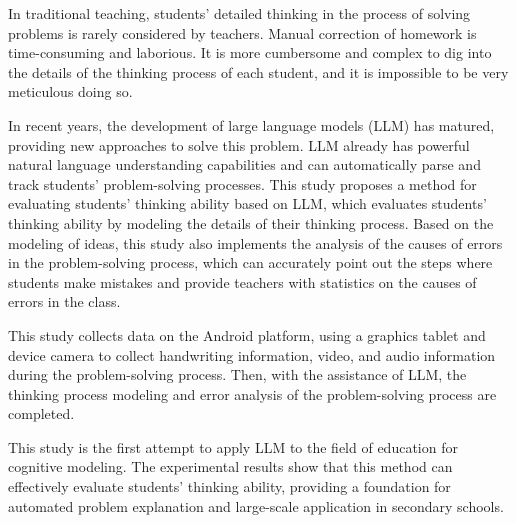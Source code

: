 \begin{abstract*}

  In traditional teaching, students' detailed thinking in the process of solving problems is rarely considered by teachers. Manual correction of homework is time-consuming and laborious. It is more cumbersome and complex to dig into the details of the thinking process of each student, and it is impossible to be very meticulous doing so.

  In recent years, the development of large language models (LLM) has matured, providing new approaches to solve this problem. LLM already has powerful natural language understanding capabilities and can automatically parse and track students' problem-solving processes. This study proposes a method for evaluating students' thinking ability based on LLM, which evaluates students' thinking ability by modeling the details of their thinking process. Based on the modeling of ideas, this study also implements the analysis of the causes of errors in the problem-solving process, which can accurately point out the steps where students make mistakes and provide teachers with statistics on the causes of errors in the class.

  This study collects data on the Android platform, using a graphics tablet and device camera to collect handwriting information, video, and audio information during the problem-solving process. Then, with the assistance of LLM, the thinking process modeling and error analysis of the problem-solving process are completed.

  This study is the first attempt to apply LLM to the field of education for cognitive modeling. The experimental results show that this method can effectively evaluate students' thinking ability, providing a foundation for automated problem explanation and large-scale application in secondary schools.

\end{abstract*}
